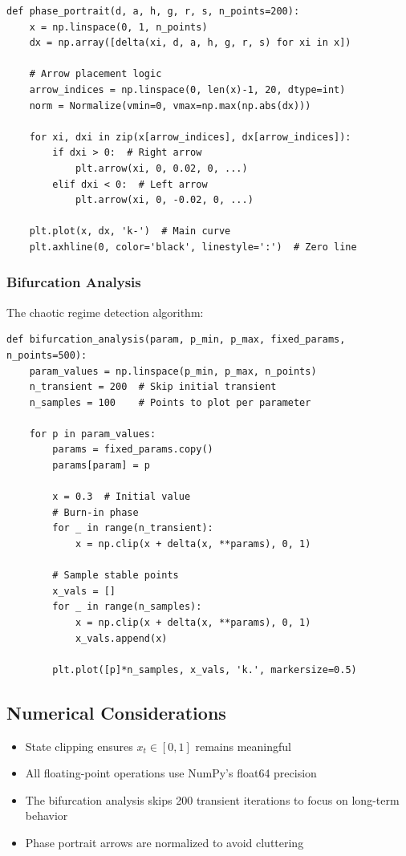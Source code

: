 \documentclass[a4paper, 11pt]{article}
\begin{document}
\begin{lstlisting}[caption=Phase Portrait Generation]
def phase_portrait(d, a, h, g, r, s, n_points=200):
    x = np.linspace(0, 1, n_points)
    dx = np.array([delta(xi, d, a, h, g, r, s) for xi in x])
    
    # Arrow placement logic
    arrow_indices = np.linspace(0, len(x)-1, 20, dtype=int)
    norm = Normalize(vmin=0, vmax=np.max(np.abs(dx)))
    
    for xi, dxi in zip(x[arrow_indices], dx[arrow_indices]):
        if dxi > 0:  # Right arrow
            plt.arrow(xi, 0, 0.02, 0, ...)
        elif dxi < 0:  # Left arrow
            plt.arrow(xi, 0, -0.02, 0, ...)
    
    plt.plot(x, dx, 'k-')  # Main curve
    plt.axhline(0, color='black', linestyle=':')  # Zero line
\end{lstlisting}

\subsubsection{Bifurcation Analysis}
The chaotic regime detection algorithm:

\begin{lstlisting}[caption=Bifurcation Analysis]
def bifurcation_analysis(param, p_min, p_max, fixed_params, n_points=500):
    param_values = np.linspace(p_min, p_max, n_points)
    n_transient = 200  # Skip initial transient
    n_samples = 100    # Points to plot per parameter
    
    for p in param_values:
        params = fixed_params.copy()
        params[param] = p
        
        x = 0.3  # Initial value
        # Burn-in phase
        for _ in range(n_transient):
            x = np.clip(x + delta(x, **params), 0, 1)
        
        # Sample stable points
        x_vals = []
        for _ in range(n_samples):
            x = np.clip(x + delta(x, **params), 0, 1)
            x_vals.append(x)
        
        plt.plot([p]*n_samples, x_vals, 'k.', markersize=0.5)
\end{lstlisting}

\subsection{Numerical Considerations}
\begin{itemize}
	\item State clipping ensures $x_t \in [0,1]$ remains meaningful
	\item All floating-point operations use NumPy's float64 precision
	\item The bifurcation analysis skips 200 transient iterations to focus on long-term behavior
	\item Phase portrait arrows are normalized to avoid cluttering
\end{itemize}
\end{document}
